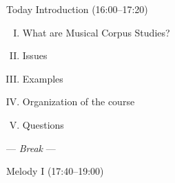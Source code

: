 
\begin{frame}{Today}
  Introduction (16:00--17:20)
  \begin{enumerate}[I.]
    \item What are Musical Corpus Studies?
    \item Issues
    \item Examples
    \item Organization of the course
    \item Questions
  \end{enumerate}

  --- \textit{Break} ---

  Melody I (17:40--19:00)
\end{frame}